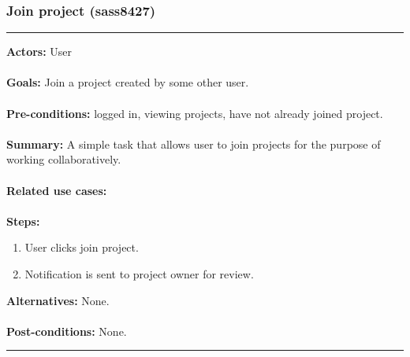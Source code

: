 \documentclass[11pt]{report}
\begin{document}
\subsubsection{Join project (sass8427)}
\vspace{2pt}
\hrule
\vspace{8pt}
 \textbf{Actors:} User \\ \\
\textbf{Goals:} Join a project created by some other user. \\ \\
 \textbf{Pre-conditions:} logged in, viewing projects, have not already joined project.  \\ \\
\textbf{Summary:} A simple task that allows user to join projects for the purpose of working collaboratively.\\ \\
\textbf{Related use cases:} \\ \\
\textbf{Steps:} \begin{enumerate}
  \item User clicks join project. 
  \item Notification is sent to project owner for review. 
 \end{enumerate}
 \textbf{Alternatives:} None. \\ \\
 \textbf{Post-conditions:} None. \\
\vspace{8pt}
\hrule
\newpage
\end{document}
